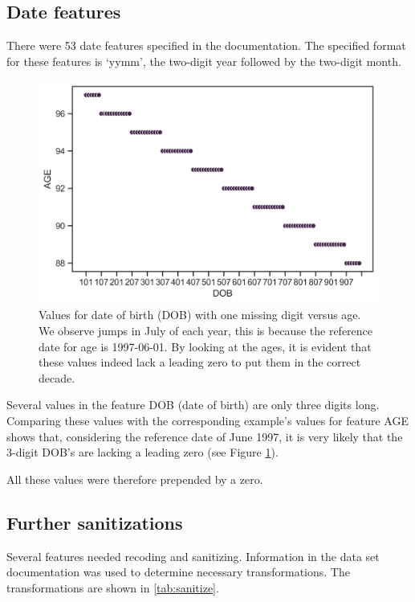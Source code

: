 \documentclass[
  11pt,
  a4paper,
  DIV=12,captions=tableheading,oneside]{scrbook}
\begin{document}
\hypertarget{date-features}{%
\subsection{Date features}\label{date-features}}

There were 53 date features specified in the documentation. The specified format for these features is `yymm', the two-digit year followed by the two-digit month.

\begin{figure}

{\centering \includegraphics[width=0.7\linewidth]{./figures/date-cleaning-1} 

}

\caption{Values for date of birth (DOB) with one missing digit versus age. We observe jumps in July of each year, this is because the reference date for age is 1997-06-01. By looking at the ages, it is evident that these values indeed lack a leading zero to put them in the correct decade.}\label{fig:date-cleaning}
\end{figure}

Several values in the feature DOB (date of birth) are only three digits long. Comparing these values with the corresponding example's values for feature AGE shows that, considering the reference date of June 1997, it is very likely that the 3-digit DOB's are lacking a leading zero (see Figure \ref{fig:date-cleaning}).

All these values were therefore prepended by a zero.

\hypertarget{further-sanitizations}{%
\subsection{Further sanitizations}\label{further-sanitizations}}

Several features needed recoding and sanitizing. Information in the data set documentation was used to determine necessary transformations. The transformations are shown in \ref{tab:sanitize}.
\end{document}
